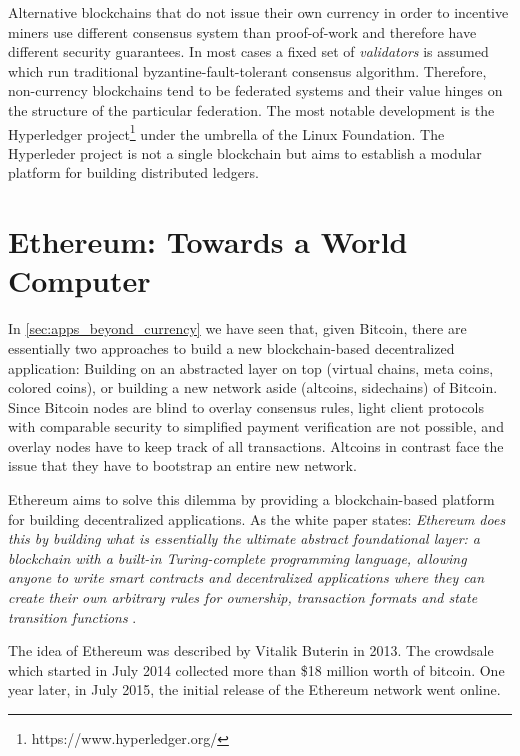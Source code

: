 Alternative blockchains that do not issue their own currency in order to incentive miners use different consensus system than proof-of-work and therefore have different security guarantees. In most cases a fixed set of \emph{validators} is assumed which run traditional byzantine-fault-tolerant consensus algorithm. Therefore, non-currency blockchains tend to be federated systems and their value hinges on the structure of the particular federation. The most notable development is the Hyperledger project\footnote{https://www.hyperledger.org/} under the umbrella of the Linux Foundation. The Hyperleder project is not a single blockchain but aims to establish a modular platform for building distributed ledgers.



\section{Ethereum: Towards a World Computer}
\label{sec:ethereum}

In \ref{sec:apps_beyond_currency} we have seen that, given Bitcoin, there are essentially two approaches to build a new blockchain-based decentralized application: Building on an abstracted layer on top (virtual chains, meta coins, colored coins), or building a new network aside (altcoins, sidechains) of Bitcoin. Since Bitcoin nodes are blind to overlay consensus rules, light client protocols with comparable security to simplified payment verification are not possible, and overlay nodes have to keep track of all transactions. Altcoins in contrast face the issue that they have to bootstrap an entire new network.

Ethereum aims to solve this dilemma by providing a blockchain-based platform for building decentralized applications. As the white paper states: \emph{Ethereum does this by building what is essentially the ultimate abstract foundational layer: a blockchain with a built-in Turing-complete programming language, allowing anyone to write smart contracts and decentralized applications where they can create their own arbitrary rules for ownership, transaction formats and state transition functions} \parencite{ethereumWhite}.

The idea of Ethereum was described by Vitalik Buterin in 2013. The crowdsale which started in July 2014 collected more than \$18 million worth of bitcoin. One year later, in July 2015, the initial release of the Ethereum network went online. 

